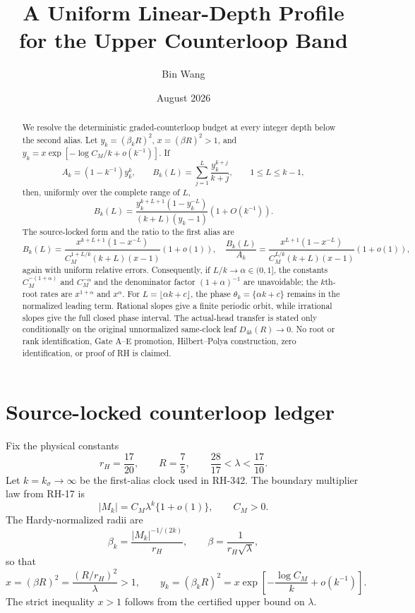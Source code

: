 \documentclass[11pt]{article}
\title{A Uniform Linear-Depth Profile\\for the Upper Counterloop Band}
\author{Bin Wang}
\date{August 2026}
\theoremstyle{remark}
\begin{document}
\maketitle

\begin{abstract}
We resolve the deterministic graded-counterloop budget at every integer depth
below the second alias.  Let $y_k=(\beta_kR)^2$, $x=(\beta R)^2>1$, and
\(y_k=x\exp[-\log C_M/k+o(k^{-1})]\).  If
\[
 A_k=(1-k^{-1})y_k^k,
 \qquad
 B_k(L)=\sum_{j=1}^{L}\frac{y_k^{k+j}}{k+j},
 \qquad 1\le L\le k-1,
\]
then, uniformly over the complete range of $L$,
\[
 B_k(L)=\frac{y_k^{k+L+1}(1-y_k^{-L})}{(k+L)(y_k-1)}
 \left(1+O(k^{-1})\right).
\]
The source-locked form and the ratio to the first alias are
\[
 B_k(L)=\frac{x^{k+L+1}(1-x^{-L})}
 {C_M^{1+L/k}(k+L)(x-1)}(1+o(1)),
 \quad
 \frac{B_k(L)}{A_k}=\frac{x^{L+1}(1-x^{-L})}
 {C_M^{L/k}(k+L)(x-1)}(1+o(1)),
\]
again with uniform relative errors.  Consequently, if $L/k\to\alpha\in(0,1]$,
the constants $C_M^{-(1+\alpha)}$ and $C_M^{-\alpha}$ and the denominator
factor $(1+\alpha)^{-1}$ are unavoidable; the $k$th-root rates are
\(x^{1+\alpha}\) and $x^\alpha$.  For
$L=\lfloor\alpha k+c\rfloor$, the phase
$\theta_k=\{\alpha k+c\}$ remains in the normalized leading term.  Rational
slopes give a finite periodic orbit, while irrational slopes give the full
closed phase interval.  The actual-head transfer is stated only conditionally
on the original unnormalized same-clock leaf $D_{4k}(R)\to0$.  No root or rank
identification, Gate A--E promotion, Hilbert--Polya construction, zero
identification, or proof of RH is claimed.
\end{abstract}

\section{Source-locked counterloop ledger}

Fix the physical constants
\begin{equation}\label{eq:constants}
 r_H=\frac{17}{20},\qquad R=\frac75,
 \qquad \frac{28}{17}<\lambda<\frac{17}{10}.
\end{equation}
Let $k=k_\sigma\to\infty$ be the first-alias clock used in RH-342.  The
boundary multiplier law from RH-17 is
\begin{equation}\label{eq:multiplier}
 |M_k|=C_M\lambda^k\{1+o(1)\},\qquad C_M>0.
\end{equation}
The Hardy-normalized radii are
\begin{equation}\label{eq:beta}
 \beta_k=\frac{|M_k|^{-1/(2k)}}{r_H},
 \qquad \beta=\frac1{r_H\sqrt\lambda},
\end{equation}
so that
\begin{equation}\label{eq:x-y}
 x=(\beta R)^2=\frac{(R/r_H)^2}{\lambda}>1,
 \qquad
 y_k=(\beta_kR)^2
 =x\exp\left[-\frac{\log C_M}{k}+o(k^{-1})\right].
\end{equation}
The strict inequality $x>1$ follows from the certified upper bound on
$\lambda$\citep{WangProjectorMass2026,WangTimeOrdered2026}.
\end{document}
